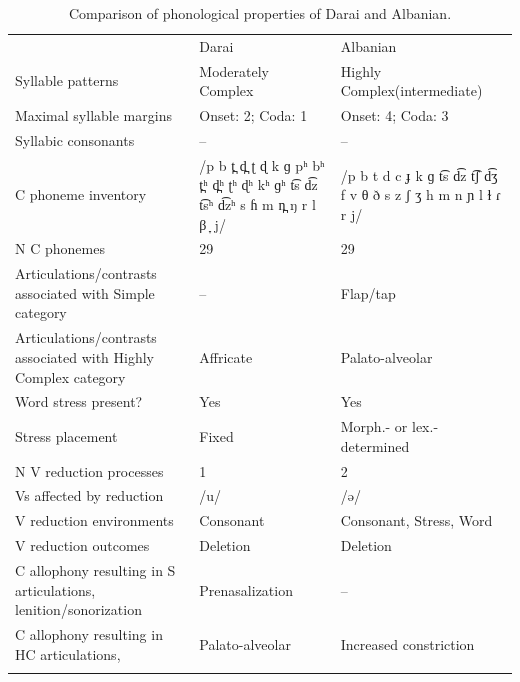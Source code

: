 \begin{table}
\small
\begin{tabularx}{\textwidth}{IQQ}
\lsptoprule
 & {Darai} & {Albanian}\\
 {Syllable patterns} & Moderately Complex & Highly Complex\newline (intermediate)\\
 \midrule 
 {Maximal syllable margins} & Onset: 2; Coda: 1 & Onset: 4; Coda: 3\\
 \tablevspace
 {Syllabic consonants} & -- & --\\
 \tablevspace
 {C phoneme inventory} & /p b t̪ d̪ ʈ ɖ k ɡ pʰ bʰ t̪ʰ d̪ʰ ʈʰ ɖʰ kʰ ɡʰ t͡s d͡z t͡sʰ d͡zʰ s ɦ m n̪ ŋ r l β ̞ j/ & /p b t d c ɟ k ɡ t͡s d͡z t͡ʃ d͡ʒ f v θ ð s z ʃ ʒ h m n ɲ l ɫ ɾ r j/\\
 \tablevspace
 {N C phonemes} & 29 & 29\\
 \tablevspace
 {Articulations/contrasts associated with {Simple}} {category} & {--} & {Flap/tap}\\
 \tablevspace
 {Articulations/contrasts associated with {Highly Complex}} {category} & {Affricate} & { {Palato-alveolar}}\\
 \tablevspace
 {Word stress present?} & {Yes} & {Yes}\\
 \tablevspace
 {Stress placement} & {Fixed} & {Morph.- or lex.-determined}\\
 \tablevspace
 {N V reduction processes} & {1} & {2}\\
 \tablevspace
 {Vs affected by reduction}  & {/u/} & {/ə/}\\
 \tablevspace
 {V reduction environments} & {Consonant} & {Consonant, Stress, Word}\\
 \tablevspace
 {V reduction outcomes} & {Deletion} & {Deletion}\\
 \tablevspace
 {C allophony resulting in S articulations, lenition/sonorization} & { {Prenasalization}} & {--}\\
 \tablevspace
{ {C allophony resulting in HC articulations,} } & { {Palato-alveolar}} & {Increased constriction}\\
\lspbottomrule
\end{tabularx}
\caption{\label{tab:8.6}Comparison of phonological properties of Darai and Albanian.}
\end{table}

